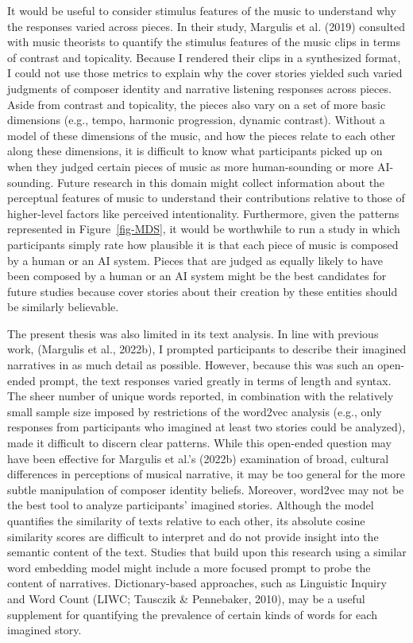 \documentclass[12pt,twoside]{reedthesis}
\begin{document}
It would be useful to consider stimulus features of the music to understand why the responses varied across pieces.  In their study, Margulis et al. (2019) consulted with music theorists to quantify the stimulus features of the music clips in terms of contrast and topicality. Because I rendered their clips in a synthesized format, I could not use those metrics to explain why the cover stories yielded such varied judgments of composer identity and narrative listening responses across pieces. Aside from contrast and topicality, the pieces also vary on a set of more basic dimensions (e.g., tempo, harmonic progression, dynamic contrast). Without a model of these dimensions of the music, and how the pieces relate to each other along these dimensions, it is difficult to know what participants picked up on when they judged certain pieces of music as more human-sounding or more AI-sounding. Future research in this domain might collect information about the perceptual features of music to understand their contributions relative to those of higher-level factors like perceived intentionality. Furthermore, given the patterns represented in Figure~\ref*{fig-MDS}, it would be worthwhile to run a study in which participants simply rate how plausible it is that each piece of music is composed by a human or an AI system. Pieces that are judged as equally likely to have been composed by a human or an AI system might be the best candidates for future studies because  cover stories about their creation by these entities should be similarly believable.

The present thesis was also limited in its text analysis. In line with previous work, (Margulis et al., 2022b), I prompted participants to describe their imagined narratives in as much detail as possible. However, because this was such an open-ended prompt, the text responses varied greatly in terms of length and syntax. The sheer number of unique words reported, in combination with the relatively small sample size imposed by restrictions of the word2vec analysis (e.g., only responses from participants who imagined at least two stories could be analyzed), made it difficult to discern clear patterns. While this open-ended question may have been effective for Margulis et al.’s (2022b) examination of broad, cultural differences in perceptions of musical narrative, it may be too general for the more subtle manipulation of composer identity beliefs. Moreover, word2vec may not be the best tool to analyze participants’ imagined stories. Although the model quantifies the similarity of texts relative to each other, its absolute cosine similarity scores are difficult to interpret and do not provide insight into the semantic content of the text. Studies that build upon this research using a similar word embedding model might include a more focused prompt to probe the content of narratives. Dictionary-based approaches, such as Linguistic Inquiry and Word Count (LIWC; Tausczik \& Pennebaker, 2010), may be a useful supplement for quantifying the prevalence of certain kinds of words for each imagined story.
\end{document}
